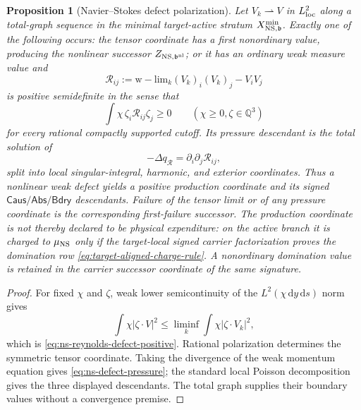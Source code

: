 \documentclass[11pt]{article}
\numberwithin{section}{part}
\theoremstyle{plain}
\newtheorem{proposition}[proposition]{Proposition}
\theoremstyle{definition}
\theoremstyle{remark}
\newcommand{\dd}{\,\mathrm d}
\newcommand{\Caus}{\mathsf{Caus}}
\newcommand{\Abs}{\mathsf{Abs}}
\newcommand{\Bdry}{\mathsf{Bdry}}
\begin{document}
\begin{proposition}[Navier--Stokes defect polarization]
\label{prop:ns-defect-polarization}
Let \(V_k\rightharpoonup V\) in \(L^2_{\rm loc}\) along a total-graph
sequence in the minimal target-active stratum
\(X^{\min}_{{\rm NS},\mathfrak b}\).  Exactly one of the
following occurs: the tensor coordinate has a first nonordinary value,
producing the nonlinear successor
\(Z_{{\rm NS},\mathfrak b^{\rm nl}}\); or it has an ordinary weak measure value and
\[
 \mathcal R_{ij}
 :=\mathrm{w\!\!\!-lim}_k(V_k)_i(V_k)_j-V_iV_j
\]
is positive semidefinite in the sense that
\begin{equation}
 \label{eq:ns-reynolds-defect-positive}
 \int\chi\,\zeta_i\mathcal R_{ij}\zeta_j\ge0
 \qquad(\chi\ge0, \zeta\in\mathbb Q^3)
\end{equation}
for every rational compactly supported cutoff.  Its pressure descendant is
the total solution of
\begin{equation}
 \label{eq:ns-defect-pressure}
 -\Delta q_{\mathcal R}=\partial_i\partial_j\mathcal R_{ij},
\end{equation}
split into local singular-integral, harmonic, and exterior coordinates.
Thus a nonlinear weak defect yields a positive production coordinate and its
signed \(\Caus/\Abs/\Bdry\) descendants.  Failure of the tensor limit or of
any pressure coordinate is the corresponding first-failure successor.
The production coordinate is not thereby declared to be physical
expenditure: on the active branch it is charged to \(\mu_{\rm NS}\) only if
the target-local signed carrier factorization proves the domination row
\eqref{eq:target-aligned-charge-rule}.  A nonordinary domination value is
retained in the carrier successor coordinate of the same signature.
\end{proposition}

\begin{proof}
For fixed \(\chi\) and \(\zeta\), weak lower semicontinuity of the
\(L^2(\chi\dd y\dd s)\) norm gives
\[
 \int\chi|\zeta\cdot V|^2
 \le\liminf_k\int\chi|\zeta\cdot V_k|^2,
\]
which is \eqref{eq:ns-reynolds-defect-positive}.  Rational polarization
determines the symmetric tensor coordinate.  Taking the divergence of the
weak momentum equation gives \eqref{eq:ns-defect-pressure}; the standard
local Poisson decomposition gives the three displayed descendants.  The
total graph supplies their boundary values without a convergence premise.
\end{proof}
\end{document}
